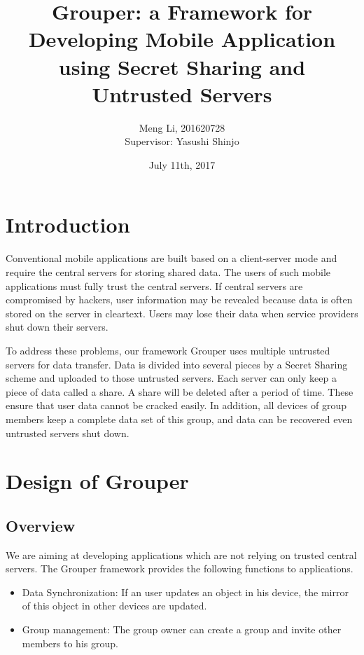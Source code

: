 \documentclass[twocolumn,10pt]{article}
\begin{document}
\small
\date{July 11th, 2017}

\title{\bf Grouper: a Framework for Developing Mobile Application using Secret Sharing and Untrusted Servers}

\author{
	Meng Li, 201620728  
	\\ Supervisor: Yasushi Shinjo
}

\maketitle

\section{Introduction}

Conventional mobile applications are built based on a client-server mode and require the central servers for storing shared data. 
The users of such mobile applications must fully trust the central servers. 
If central servers are compromised by hackers, user information may be revealed because data is often stored on the server in cleartext. 
Users may lose their data when service providers shut down their servers. 

To address these problems, our framework Grouper uses multiple untrusted servers for data transfer. 
Data is divided into several pieces by a Secret Sharing scheme and uploaded to those untrusted servers. 
Each server can only keep a piece of data called a share. A share will be deleted after a period of time. 
These ensure that user data cannot be cracked easily. 
In addition, all devices of group members keep a complete data set of this group, and data can be recovered even untrusted servers shut down.

\section{Design of Grouper}

\subsection{Overview}

We are aiming at developing applications which are not relying on trusted central servers. 
The Grouper framework provides the following functions to applications.

\begin{itemize}
	\setlength{\itemsep}{1pt}
	\setlength{\parskip}{0pt}
	\setlength{\parsep}{0pt}
	\item Data Synchronization: If an user updates an object in his device, the mirror of this object in other devices are updated.
	\item Group management: The group owner can create a group and invite other members to his group.
\end{itemize}
\end{document}
